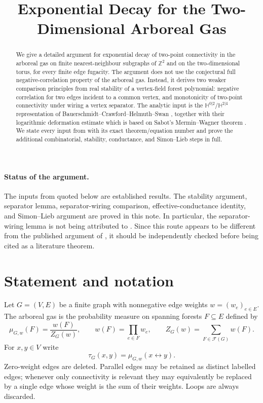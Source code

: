 \documentclass[11pt]{article}
\title{Exponential Decay for the Two-Dimensional Arboreal Gas}
\author{}
\date{}
\theoremstyle{definition}
\theoremstyle{remark}
\newcommand{\ZZ}{\mathbb Z}
\newcommand{\HH}{\mathbb H}
\newcommand{\cF}{\mathcal F}
\newcommand{\1}{\mathbf 1}
\begin{document}
\maketitle

\begin{abstract}
We give a detailed argument for exponential decay of two-point connectivity in the
arboreal gas on finite nearest-neighbour subgraphs of $\ZZ^2$ and on the two-dimensional
torus, for every finite edge fugacity.  The argument does not use the conjectural full
negative-correlation property of the arboreal gas.  Instead, it derives two weaker
comparison principles from real stability of a vertex-field forest polynomial:
negative correlation for two edges incident to a common vertex, and monotonicity of
two-point connectivity under wiring a vertex separator.  The analytic input is the
$\HH^{0|2}$/$\HH^{2|4}$ representation of Bauerschmidt--Crawford--Helmuth--Swan
\cite{BCHS}, together with their logarithmic deformation estimate which is based on
Sabot's Mermin--Wagner theorem \cite{Sabot}.  We state every
input from \cite{BCHS} with its exact theorem/equation number and prove the additional combinatorial,
stability, conductance, and Simon--Lieb steps in full.
\end{abstract}

\paragraph{Status of the argument.}
The inputs from \cite{BCHS} quoted below are established results.  The stability argument,
separator lemma, separator-wiring comparison, effective-conductance identity, and
Simon--Lieb argument are proved in this note.  In particular, the separator-wiring
lemma is not being attributed to \cite{BCHS}.  Since this route appears to be different from
the published argument of \cite{BCHS}, it should be independently checked before being cited as
a literature theorem.

\section{Statement and notation}

Let $G=(V,E)$ be a finite graph with nonnegative edge weights $w=(w_e)_{e\in E}$.
The arboreal gas is the probability measure on spanning forests
$F\subseteq E$ defined by
\begin{equation}\label{eq:forest-measure}
 \mu_{G,w}(F)=\frac{w(F)}{Z_G(w)},\qquad
 w(F)=\prod_{e\in F}w_e,\qquad
 Z_G(w)=\sum_{F\in\cF(G)}w(F).
\end{equation}
For $x,y\in V$ write
\begin{equation}
 \tau_G(x,y)=\mu_{G,w}(x\leftrightarrow y).
\end{equation}
Zero-weight edges are deleted.  Parallel edges may be retained as distinct labelled
edges; whenever only connectivity is relevant they may equivalently be replaced by a
single edge whose weight is the sum of their weights.  Loops are always discarded.
\end{document}
